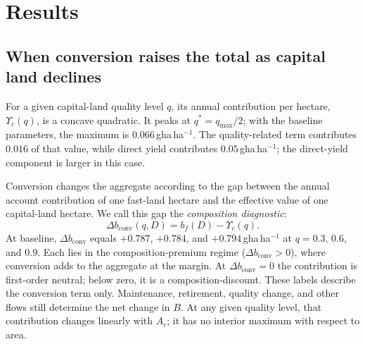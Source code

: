 \documentclass[preprint,12pt,authoryear]{elsarticle}
\newcommand{\dconv}{\Delta b_{\mathrm{conv}}}
\newcommand{\Ups}{\Upsilon_c}
\begin{document}
\section{Results}\label{sec:results}

\subsection{When conversion raises the total as capital land declines}\label{sec:mask}

For a given capital-land quality level $q$, its annual contribution per hectare, $\Ups(q)$, is a concave quadratic. It peaks at $q^*=q_{\max}/2$; with the baseline parameters, the maximum is $0.066$\,gha\,ha$^{-1}$. The quality-related term contributes $0.016$ of that value, while direct yield contributes $0.05$\,gha\,ha$^{-1}$; the direct-yield component is larger in this case.

Conversion changes the aggregate according to the gap between the annual account contribution of one fast-land hectare and the effective value of one capital-land hectare. We call this gap the \emph{composition diagnostic}:
\begin{equation}\label{eq:dconv}
\dconv(q,D)=b_f(D)-\Ups(q).
\end{equation}
At baseline, $\dconv$ equals $+0.787$, $+0.784$, and $+0.794$\,gha\,ha$^{-1}$ at $q=0.3$, $0.6$, and $0.9$. Each lies in the composition-premium regime ($\dconv>0$), where conversion adds to the aggregate at the margin. At $\dconv=0$ the contribution is first-order neutral; below zero, it is a composition-discount. These labels describe the conversion term only. Maintenance, retirement, quality change, and other flows still determine the net change in $B$. At any given quality level, that contribution changes linearly with $A_c$; it has no interior maximum with respect to area.
\end{document}
